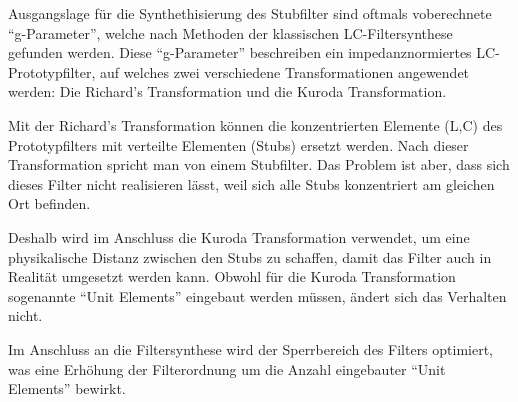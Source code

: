 Ausgangslage  für  die  Synthethisierung  des  Stubfilter  sind oftmals voberechnete
``g-Parameter'',  welche  nach  Methoden  der   klassischen  LC-Filtersynthese
gefunden  werden.  Diese  ``g-Parameter'' beschreiben  ein  impedanznormiertes
LC-Prototypfilter, auf    welches    zwei    verschiedene   Transformationen
angewendet werden: Die Richard's Transformation und die Kuroda Transformation.

Mit der Richard's Transformation können  die konzentrierten Elemente (L,C) des
Prototypfilters mit verteilte  Elementen  (Stubs)  ersetzt werden. Nach dieser
Transformation  spricht  man  von einem Stubfilter. Das Problem ist aber, dass
sich dieses Filter nicht realisieren lässt,  weil sich alle Stubs konzentriert
am gleichen Ort befinden.

Deshalb  wird  im Anschluss  die  Kuroda  Transformation  verwendet,  um  eine
physikalische Distanz zwischen den Stubs zu schaffen, damit das Filter auch in
Realit\"at  umgesetzt  werden  kann.  Obwohl  für  die  Kuroda  Transformation
sogenannte  ``Unit  Elements''  eingebaut  werden  müssen,  ändert   sich  das
Verhalten nicht.

Im  Anschluss  an   die  Filtersynthese  wird  der  Sperrbereich  des  Filters
optimiert,  was  eine  Erhöhung  der Filterordnung um die  Anzahl  eingebauter
``Unit  Elements'' bewirkt.






